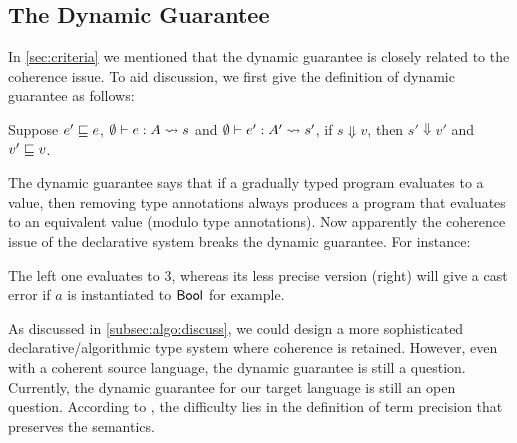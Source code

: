 \subsection{The Dynamic Guarantee}
\label{subsec:dynamic}


In \cref{sec:criteria} we mentioned that the dynamic guarantee is closely related
to the coherence issue. To aid discussion, we first give the definition of
dynamic guarantee as follows:

\begin{definition}
  Suppose $e' \sqsubseteq e$, $ \emptyset \vdash e : A \rightsquigarrow{s}$ and $ \emptyset
  \vdash e' : A' \rightsquigarrow{s}'$, if $s \Downarrow v$, then $s' \Downarrow v'$ and $v'
  \sqsubseteq v$.
\end{definition}

The dynamic guarantee says that if a gradually typed program evaluates to a
value, then removing type annotations always produces a program that evaluates
to an equivalent value (modulo type annotations). Now apparently the coherence
issue of the declarative system breaks the dynamic guarantee. For instance:
The left one evaluates to 3, whereas its less precise version (right) will give
a cast error if $a$ is instantiated to $\mathsf{Bool}$ for example.

As discussed in \cref{subsec:algo:discuss}, we could design a more sophisticated
declarative/algorithmic type system where coherence is retained. However, even
with a coherent source language, the dynamic guarantee is still a
question. Currently, the dynamic guarantee for our target language \pbc is still an open
question. According to \citet{yuu2017poly}, the difficulty lies in the definition of term precision
that preserves the semantics.


